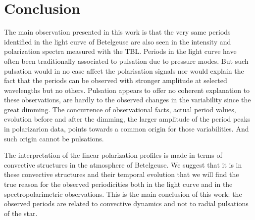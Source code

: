 \documentclass{aa}
\begin{document}




\section{Conclusion}

The main observation  presented in this work is that the very same periods identified in the light curve of Betelgeuse are also seen in the intensity and polarization
spectra measured with the TBL. Periods in the light curve have often been traditionally associated to pulsation due to pressure modes. But 
such pulsation would in no case affect the polarisation signals nor would explain the fact that the periods can be observed with stronger 
amplitude at selected wavelengths but no others.  Pulsation appears to offer no coherent explanation to these observations, are hardly to the 
observed changes in the variability since the great dimming.  The concurrence of observational facts, actual period values, evolution before 
and after the dimming, the larger amplitude of the period peaks in polarizarion data, points towards a common origin for those variabilities. 
And such origin cannot be pulsations.

The interpretation of the linear polarization profiles is made in terms of convective structures in the atmosphere of Betelgeuse. We suggest 
that it is in these convective structures and their temporal evolution that we will find the true reason for the observed periodicities both 
in the light curve and in the spectropolarimetric observations. This is the main conclusion of this work: the observed periods are related 
to convective dynamics and not to radial pulsations of the star.
\end{document}
